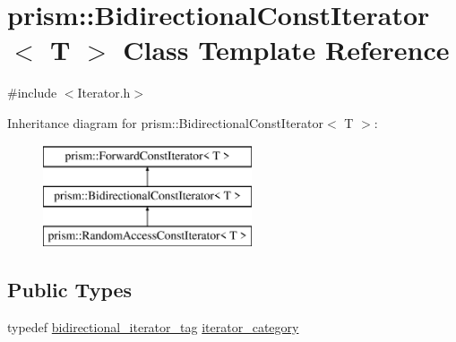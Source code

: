 \hypertarget{classprism_1_1_bidirectional_const_iterator}{}\section{prism\+:\+:Bidirectional\+Const\+Iterator$<$ T $>$ Class Template Reference}
\label{classprism_1_1_bidirectional_const_iterator}


{\ttfamily \#include $<$Iterator.\+h$>$}

Inheritance diagram for prism\+:\+:Bidirectional\+Const\+Iterator$<$ T $>$\+:\begin{figure}[H]
\begin{center}
\leavevmode
\includegraphics[height=3.000000cm]{classprism_1_1_bidirectional_const_iterator}
\end{center}
\end{figure}
\subsection*{Public Types}
\begin{DoxyCompactItemize}
\item 
typedef \hyperlink{structprism_1_1bidirectional__iterator__tag}{bidirectional\+\_\+iterator\+\_\+tag} \hyperlink{classprism_1_1_bidirectional_const_iterator_a71244ea545ce4dd225e6ad1e5d6f64a6}{iterator\+\_\+category}
\end{DoxyCompactItemize}
